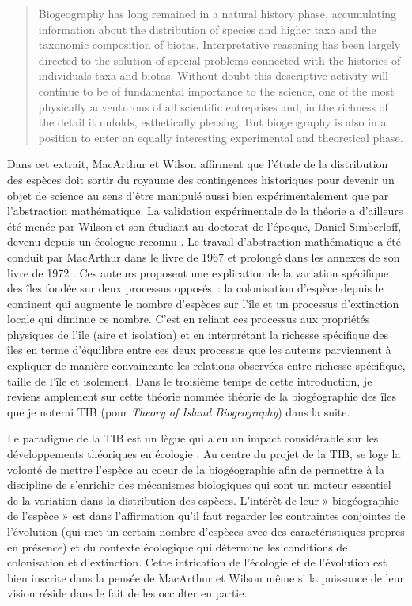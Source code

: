 \begin{quote}
Biogeography has long remained in a natural history phase, accumulating
information about the distribution of species and higher taxa and the
taxonomic composition of biotas. Interpretative reasoning has been
largely directed to the solution of special problems connected with the
histories of individuals taxa and biotas. Without doubt this descriptive
activity will continue to be of fundamental importance to the science,
one of the most physically adventurous of all scientific entreprises
and, in the richness of the detail it unfolds, esthetically pleasing.
But biogeography is also in a position to enter an equally interesting
experimental and theoretical phase.
\end{quote}

Dans cet extrait, MacArthur et Wilson affirment que l'étude de la
distribution des espèces doit sortir du royaume des contingences
historiques pour devenir un objet de science au sens d'être manipulé
aussi bien expérimentalement que par l'abstraction mathématique. La
validation expérimentale de la théorie a d'ailleurs été menée par Wilson
et son étudiant au doctorat de l'époque, Daniel Simberloff, devenu
depuis un écologue reconnu \citep{Simberloff1969}. Le travail
d'abstraction mathématique a été conduit par MacArthur dans le livre de
1967 et prolongé dans les annexes de son livre de 1972
\citep{macarthur1972geographical}. Ces auteurs proposent une explication
de la variation spécifique des îles fondée sur deux processus opposés~:
la colonisation d'espèce depuis le continent qui augmente le nombre
d'espèces sur l'île et un processus d'extinction locale qui diminue ce
nombre. C'est en reliant ces processus aux propriétés physiques de l'île
(aire et isolation) et en interprétant la richesse spécifique des îles
en terme d'équilibre entre ces deux processus que les auteurs
parviennent à expliquer de manière convaincante les relations observées
entre richesse spécifique, taille de l'île et isolement. Dans le
troisième temps de cette introduction, je reviens amplement sur cette
théorie nommée théorie de la biogéographie des îles que je noterai TIB
(pour \emph{Theory of Island Biogeography}) dans la suite.

Le paradigme de la TIB est un lègue qui a eu un impact considérable sur
les développements théoriques en écologie \citep{Warren2015}. Au centre
du projet de la TIB, se loge la volonté de mettre l'espèce au coeur de
la biogéographie afin de permettre à la discipline de s'enrichir des
mécanismes biologiques qui sont un moteur essentiel de la variation dans
la distribution des espèces. L'intérêt de leur » biogéographie de
l'espèce » \citep[le terme est mentionné à l'avant-dernière phrase de
l'ouvrage][p.183]{MacArthur1967} est dans l'affirmation qu'il faut
regarder les contraintes conjointes de l'évolution (qui met un certain
nombre d'espèces avec des caractéristiques propres en présence) et du
contexte écologique qui détermine les conditions de colonisation et
d'extinction. Cette intrication de l'écologie et de l'évolution est bien
inscrite dans la pensée de MacArthur et Wilson même si la puissance de
leur vision réside dans le fait de les occulter en partie.

